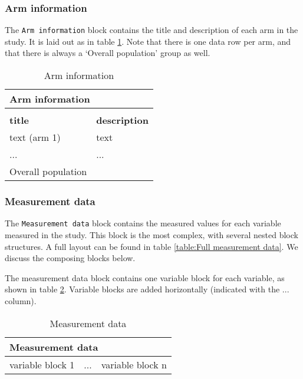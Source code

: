 \documentclass[a4paper,10pt]{article}
\begin{document}
\subsubsection{Arm information}
The \texttt{Arm information} block contains the title and description of each arm in the study. It is laid out as in table \ref{table:Arm information}. Note that there is one data row per arm, and that there is always a `Overall population' group as well.
\begin{table}[h]
  \centering
  \caption{Arm information}
  \label{table:Arm information}
  \begin{tabular}{|l|l|}
    \hline
    \multicolumn{2}{|l|}{\textbf{Arm information}}  \\ \hline
    \multicolumn{2}{|l|}{}                          \\ \hline
    \textbf{title} & \textbf{description}           \\ \hline
    text (arm 1)& text                              \\ \hline
    ... & ...                                       \\ \hline
    Overall population&                             \\ \hline
  \end{tabular}
\end{table}

\subsubsection{Measurement data}
The \texttt{Measurement data} block contains the measured values for each variable measured in the study. This block is the most complex, with several nested block structures. A full layout can be found in table \ref{table:Full measurement data}. We discuss the composing blocks below.

The measurement data block contains one variable block for each variable, as shown in table \ref{table:Measurement data}. Variable blocks are added horizontally (indicated with the ... column). 

\begin{table}[h]
  \centering
  \caption{Measurement data}
  \small
  \label{table:Measurement data}
  \begin{tabular}{|l|l|l|}
    \hline
    \multicolumn{3}{|l|}{\textbf{Measurement data}}  \\ \hline
    variable block 1 & ... & variable block n  \\ \hline
  \end{tabular}
\end{table}
\end{document}
